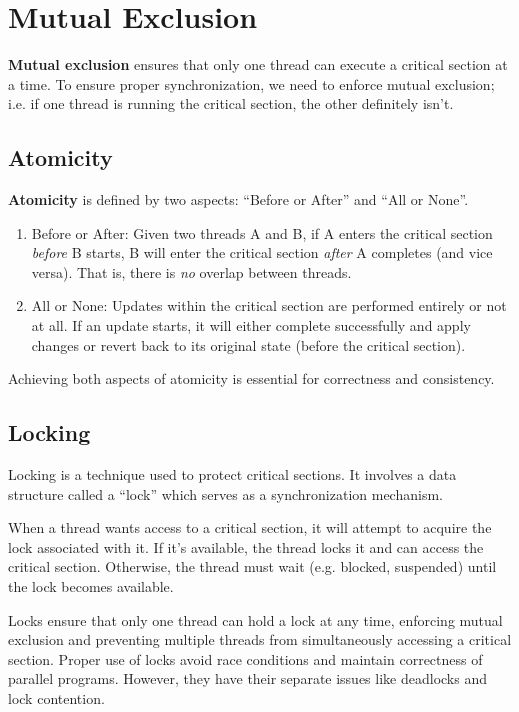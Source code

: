 \documentclass{report}
\newcommand{\definitionBegin}[1]{\begin{tcolorbox}[title={Definition: #1}]}
\newcommand{\definitionEnd}{\end{tcolorbox}}
\begin{document}
\section{Mutual Exclusion}
\definitionBegin{Mutual Exclusion}
\textbf{Mutual exclusion} ensures that only one thread can execute a critical section at a time. To ensure
proper synchronization, we need to enforce mutual exclusion; i.e. if one thread is running the
critical section, the other definitely isn't.
\definitionEnd


\subsection{Atomicity}
\definitionBegin{Atomicity}
\textbf{Atomicity} is defined by two aspects: ``Before or After'' and ``All or None''.
\begin{enumerate}[label=\textit{(\roman*)}]
\item Before or After: Given two threads A and B, if A enters the critical section \textit{before} B
  starts, B will enter the critical section \textit{after} A completes (and vice versa). That is,
  there is \textit{no} overlap between threads.
\item All or None: Updates within the critical section are performed entirely or not at all. If an
  update starts, it will either complete successfully and apply changes or revert back to its
  original state (before the critical section).
\end{enumerate}
\definitionEnd
Achieving both aspects of atomicity is essential for correctness and consistency.


\subsection{Locking}
Locking is a technique used to protect critical sections. It involves a data structure called a
``lock'' which serves as a synchronization mechanism.

When a thread wants access to a critical section, it will attempt to acquire the lock associated
with it. If it's available, the thread locks it and can access the critical section. Otherwise, the
thread must wait (e.g. blocked, suspended) until the lock becomes available.

Locks ensure that only one thread can hold a lock at any time, enforcing mutual exclusion and
preventing multiple threads from simultaneously accessing a critical section. Proper use of locks
avoid race conditions and maintain correctness of parallel programs. However, they have their
separate issues like deadlocks and lock contention.
\end{document}

